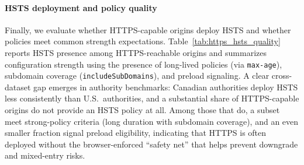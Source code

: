 \documentclass[a4paper,fleqn]{cas-sc}
\begin{document}
% 

\paragraph{HSTS deployment and policy quality}
    Finally, we evaluate whether HTTPS-capable origins deploy HSTS and whether policies meet common strength expectations. 
    Table~\ref{tab:https_hsts_quality} reports HSTS presence among HTTPS-reachable origins and summarizes configuration strength using the presence of long-lived policies (via \texttt{max-age}), subdomain coverage (\texttt{includeSubDomains}), and preload signaling. 
    A clear cross-dataset gap emerges in authority benchmarks: Canadian authorities deploy HSTS less consistently than U.S.\ authorities, and a substantial share of HTTPS-capable origins do not provide an HSTS policy at all.
    Among those that do, a subset meet strong-policy criteria (long duration with subdomain coverage), and an even smaller fraction signal preload eligibility, indicating that HTTPS is often deployed without the browser-enforced ``safety net'' that helps prevent downgrade and mixed-entry risks.
\end{document}
